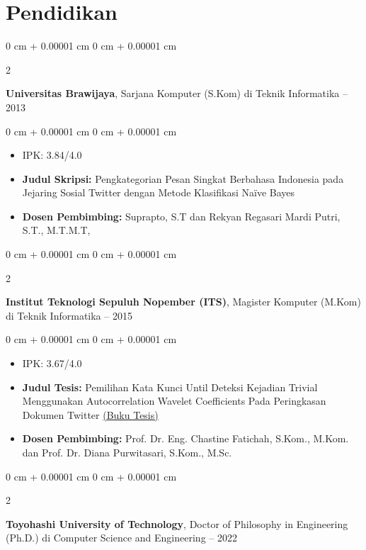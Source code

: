 \documentclass[10pt, letterpaper]{article}
\newenvironment{highlights}{
    \begin{itemize}[
        topsep=0.10 cm,
        parsep=0.10 cm,
        partopsep=0pt,
        itemsep=0pt,
        leftmargin=0 cm + 10pt
    ]
}{
    \end{itemize}
} %
\newenvironment{onecolentry}{
    \begin{adjustwidth}{
        0 cm + 0.00001 cm
    }{
        0 cm + 0.00001 cm
    }
}{
    \end{adjustwidth}
} %
\newenvironment{twocolentry}[2][]{
    \onecolentry
    \def\secondColumn{#2}
    \setcolumnwidth{\fill, 4.5 cm}
    \begin{paracol}{2}
}{
    \switchcolumn \raggedleft \secondColumn
    \end{paracol}
    \endonecolentry
} %
\begin{document}
    \section{Pendidikan}
        \begin{twocolentry}{
            2009 – 2013
        }
            \textbf{Universitas Brawijaya}, Sarjana Komputer (S.Kom) di Teknik Informatika\end{twocolentry}
        \vspace{0.10 cm}
        \begin{onecolentry}
            \begin{highlights}
                \item IPK: 3.84/4.0
                \item \textbf{Judul Skripsi:} Pengkategorian Pesan Singkat Berbahasa Indonesia pada Jejaring Sosial Twitter dengan Metode Klasifikasi Naïve Bayes
                \item \textbf{Dosen Pembimbing:} Suprapto, S.T dan Rekyan Regasari Mardi Putri, S.T., M.T.M.T, 
            \end{highlights}
        \end{onecolentry}
        \vspace{0.5 cm}
        \begin{twocolentry}{
            2013 – 2015
        }
            \textbf{Institut Teknologi Sepuluh Nopember (ITS)}, Magister Komputer (M.Kom) di Teknik Informatika\end{twocolentry}
        \vspace{0.10 cm}
        \begin{onecolentry}
            \begin{highlights}
                \item IPK: 3.67/4.0
                \item \textbf{Judul Tesis:} Pemilihan Kata Kunci Until Deteksi Kejadian Trivial Menggunakan Autocorrelation Wavelet Coefficients Pada Peringkasan Dokumen Twitter \href{https://repository.its.ac.id/63337/}{(Buku Tesis)}
                \item \textbf{Dosen Pembimbing:} Prof. Dr. Eng. Chastine Fatichah, S.Kom., M.Kom. dan Prof. Dr. Diana Purwitasari, S.Kom., M.Sc. 
            \end{highlights}
        \end{onecolentry}
        \vspace{0.5 cm}
        \begin{twocolentry}{
            2018 – 2022
        }
            \textbf{Toyohashi University of Technology}, Doctor of Philosophy in Engineering (Ph.D.) di Computer Science and Engineering\end{twocolentry}
\end{document}
